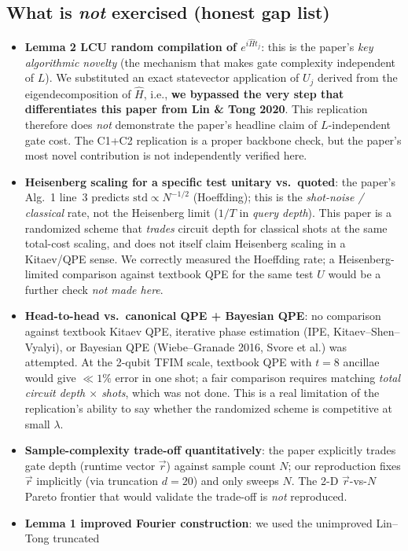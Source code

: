 \documentclass[11pt]{article}
\begin{document}
\subsection*{What is \emph{not} exercised (honest gap list)}
\begin{itemize}
\item \textbf{Lemma 2 LCU random compilation of $e^{i\hat H t_j}$}: this is the paper's
\emph{key algorithmic novelty} (the mechanism that makes gate complexity independent of $L$). We
substituted an exact statevector application of $U_j$ derived from the eigendecomposition of $\hat H$,
i.e., \textbf{we bypassed the very step that differentiates this paper from Lin \& Tong 2020}. This
replication therefore does \emph{not} demonstrate the paper's headline claim of $L$-independent gate cost.
The C1+C2 replication is a proper backbone check, but the paper's most novel contribution is not
independently verified here.
\item \textbf{Heisenberg scaling for a specific test unitary vs.\ quoted}: the paper's Alg.~1 line~3
predicts $\text{std}\propto N^{-1/2}$ (Hoeffding); this is the \emph{shot-noise / classical} rate,
not the Heisenberg limit ($1/T$ in \emph{query depth}). This paper is a randomized scheme that
\emph{trades} circuit depth for classical shots at the same total-cost scaling, and does not itself
claim Heisenberg scaling in a Kitaev/QPE sense. We correctly measured the Hoeffding rate; a
Heisenberg-limited comparison against textbook QPE for the same test $U$ would be a further check
\emph{not made here}.
\item \textbf{Head-to-head vs.\ canonical QPE + Bayesian QPE}: no comparison against textbook
Kitaev QPE, iterative phase estimation (IPE, Kitaev--Shen--Vyalyi), or Bayesian QPE (Wiebe--Granade
2016, Svore et al.) was attempted. At the 2-qubit TFIM scale, textbook QPE with $t=8$ ancillae
would give $\ll 1\%$ error in one shot; a fair comparison requires matching \emph{total circuit
depth $\times$ shots}, which was not done. This is a real limitation of the replication's ability
to say whether the randomized scheme is competitive at small $\lambda$.
\item \textbf{Sample-complexity trade-off quantitatively}: the paper explicitly trades gate depth
(runtime vector $\vec r$) against sample count $N$; our reproduction fixes $\vec r$ implicitly (via
truncation $d=20$) and only sweeps $N$. The 2-D $\vec r$-vs-$N$ Pareto frontier that would validate
the trade-off is \emph{not} reproduced.
\item \textbf{Lemma 1 improved Fourier construction}: we used the unimproved Lin--Tong truncated

\end{itemize}
\end{document}
